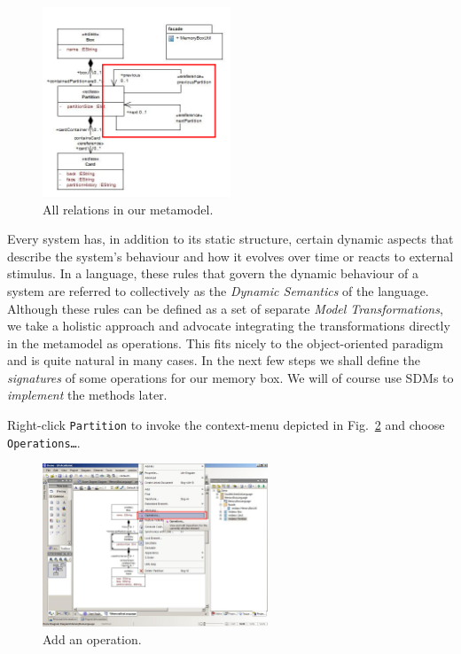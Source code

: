 \begin{figure}[htbp]
	\centering
  \includegraphics[width=0.5\textwidth]{pics/memBoxBilder/memBox34.png}
	\caption{All relations in our metamodel.}
	\label{fig:ereferences_all}  
\end{figure}

\clearpage

Every system has, in addition to its static structure, certain dynamic aspects
that describe the system's behaviour and how it evolves over time or reacts to
external stimulus.
In a language, these rules that govern the dynamic behaviour of a system are
referred to collectively as the \emph{Dynamic Semantics} of the language.  
Although these rules can be defined as a set of separate \emph{Model
Transformations}, we take a holistic approach and advocate integrating the
transformations directly in the metamodel as operations.
This fits nicely to the object-oriented paradigm and is quite natural in many
cases.  In the next few steps we shall define the \emph{signatures} of some
operations for our memory box.  We will of course use SDMs to \emph{implement}
the methods later.

Right-click \texttt{Partition} to invoke the context-menu depicted in
Fig.~\ref{fig:add_operation} and choose \texttt{Operations\ldots}.

\begin{figure}[htbp]
	\centering
  \includegraphics[width=0.6\textwidth]{pics/memBoxBilder/memBox35.png}
	\caption{Add an operation.}
	\label{fig:add_operation}
\end{figure}
 
